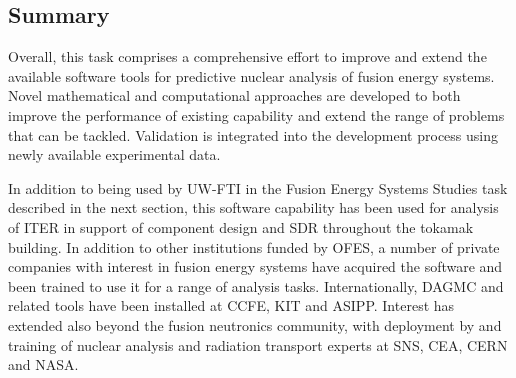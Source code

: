 \subsection{Summary}

Overall, this task comprises a comprehensive effort to improve and extend the
available software tools for predictive nuclear analysis of fusion energy
systems.  Novel mathematical and computational approaches are developed to
both improve the performance of existing capability and extend the range of
problems that can be tackled.  Validation is integrated into the development
process using newly available experimental data.

In addition to being used by \gls{UW-FTI} in the Fusion Energy Systems Studies
task described in the next section, this software capability has been used for
analysis of ITER in support of component design and \gls{SDR} throughout the
tokamak building.  In addition to other institutions funded by OFES, a number
of private companies with interest in fusion energy systems have acquired the
software and been trained to use it for a range of analysis tasks.
Internationally, \gls{DAGMC} and related tools have been installed at CCFE,
KIT and ASIPP.  Interest has extended also beyond the fusion neutronics
community, with deployment by and training of nuclear analysis and radiation
transport experts at \gls{SNS}, CEA, CERN and NASA.

